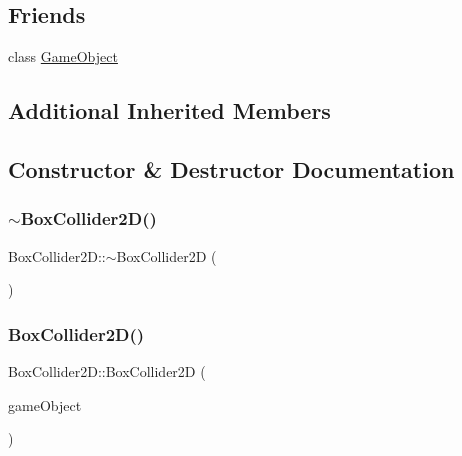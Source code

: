 \subsection*{Friends}
\begin{DoxyCompactItemize}
\item 
class \hyperlink{class_mason_1_1_box_collider2_d_a00df87c957d8f7ee0fc51f07a0542f4a}{Game\+Object}
\end{DoxyCompactItemize}
\subsection*{Additional Inherited Members}


\subsection{Constructor \& Destructor Documentation}
\hypertarget{class_mason_1_1_box_collider2_d_a623201cca71e261e893b9ffa795eb4a7}{}\label{class_mason_1_1_box_collider2_d_a623201cca71e261e893b9ffa795eb4a7} 
\subsubsection{\texorpdfstring{$\sim$\+Box\+Collider2\+D()}{~BoxCollider2D()}}
{\footnotesize\ttfamily Box\+Collider2\+D\+::$\sim$\+Box\+Collider2D (\begin{DoxyParamCaption}{ }\end{DoxyParamCaption})}

\hypertarget{class_mason_1_1_box_collider2_d_a5b81f4bc97912c6f8375a427819d6d68}{}\label{class_mason_1_1_box_collider2_d_a5b81f4bc97912c6f8375a427819d6d68} 
\subsubsection{\texorpdfstring{Box\+Collider2\+D()}{BoxCollider2D()}}
{\footnotesize\ttfamily Box\+Collider2\+D\+::\+Box\+Collider2D (\begin{DoxyParamCaption}\item[{std\+::shared\+\_\+ptr$<$ \hyperlink{class_mason_1_1_game_object}{Game\+Object} $>$}]{game\+Object }\end{DoxyParamCaption})\hspace{0.3cm}{\ttfamily [protected]}}



